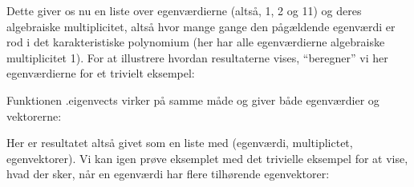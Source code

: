 \documentclass[letterpaper,10pt,english]{jupyterBook}
\begin{document}
\noindent{}

Dette giver os nu en liste over egenværdierne (altså, 1, 2 og 11) og deres algebraiske multiplicitet, altså hvor mange gange den pågældende egenværdi er rod i det karakteristiske polynomium (her har alle egenværdierne algebraiske multiplicitet 1). For at illustrere hvordan resultaterne vises, “beregner” vi her egenværdierne for et trivielt eksempel:

\begin{sphinxVerbatim}[commandchars=\\\{\}]
   
  \PYG{p}{[}\PYG{p}{[}   \PYG{p}{]} \PYG{p}{[}   \PYG{p}{]} \PYG{p}{[}   \PYG{p}{]} \PYG{p}{[}   \PYG{p}{]}\PYG{p}{]}
\end{sphinxVerbatim}

\noindent{}

\begin{sphinxVerbatim}[commandchars=\\\{\}]
\end{sphinxVerbatim}

\noindent{}

Funktionen .eigenvects virker på samme måde og giver både egenværdier og \sphinxhyphen{}vektorerne:

\begin{sphinxVerbatim}[commandchars=\\\{\}]
\end{sphinxVerbatim}

\noindent{}

Her er resultatet altså givet som en liste med (egenværdi, multiplictet, egenvektorer). Vi kan igen prøve eksemplet med det trivielle eksempel for at vise, hvad der sker, når en egenværdi har flere tilhørende egenvektorer:
\end{document}
